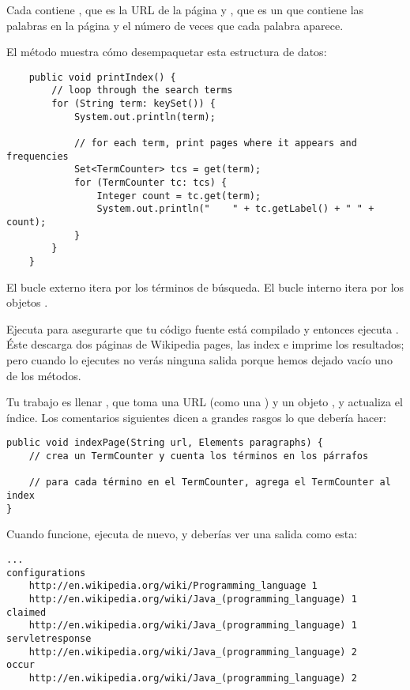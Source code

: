 \documentclass[12pt]{book}
\theoremstyle{exercise}
\begin{document}

Cada  contiene , que es la URL
de la página y , que es un  que
contiene las palabras en la página y el número de veces
que cada palabra aparece.

El método  muestra cómo
desempaquetar esta estructura de datos:

\begin{verbatim}
    public void printIndex() {
        // loop through the search terms
        for (String term: keySet()) {
            System.out.println(term);

            // for each term, print pages where it appears and frequencies
            Set<TermCounter> tcs = get(term);
            for (TermCounter tc: tcs) {
                Integer count = tc.get(term);
                System.out.println("    " + tc.getLabel() + " " + count);
            }
        }
    }
\end{verbatim}

El bucle externo itera por los términos de búsqueda. El bucle interno itera por
los objetos .


Ejecuta  para asegurarte que tu código fuente está compilado y
entonces ejecuta . Éste descarga dos páginas de Wikipedia pages, las
index e imprime los resultados; pero cuando lo ejecutes no verás ninguna
salida porque hemos dejado vacío uno de los métodos.


Tu trabajo es llenar , que toma una URL (como una
) y un objeto , y actualiza el índice. Los
comentarios siguientes dicen a grandes rasgos lo que debería hacer:

\begin{verbatim}
public void indexPage(String url, Elements paragraphs) {
    // crea un TermCounter y cuenta los términos en los párrafos

    // para cada término en el TermCounter, agrega el TermCounter al index
}
\end{verbatim}

Cuando funcione, ejecuta  de nuevo, y deberías ver
  una salida como esta:

\begin{verbatim}
...
configurations
    http://en.wikipedia.org/wiki/Programming_language 1
    http://en.wikipedia.org/wiki/Java_(programming_language) 1
claimed
    http://en.wikipedia.org/wiki/Java_(programming_language) 1
servletresponse
    http://en.wikipedia.org/wiki/Java_(programming_language) 2
occur
    http://en.wikipedia.org/wiki/Java_(programming_language) 2
\end{verbatim}
\end{document}
